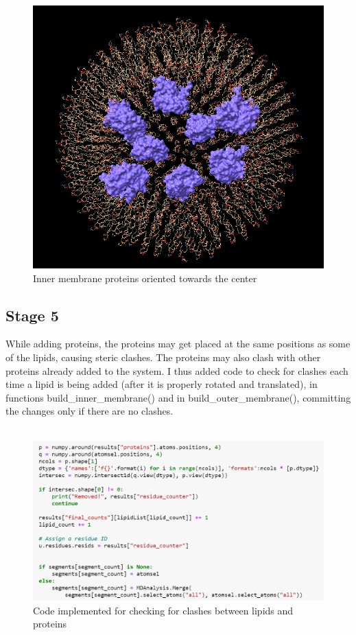 \documentclass[12pt, a4paper]{report}
\begin{document}
\begin{figure}[h]
    \includegraphics[scale=0.9]{images/inner membrane p.png} 
    \centering 
    \caption{Inner membrane proteins oriented towards the center}
    \centering
\end{figure} 

\clearpage
\subsection*{Stage 5} 

While adding proteins, the proteins may get placed at the same positions as some of the lipids, causing steric clashes. The proteins may also clash with other proteins already added to the system. I thus added code to check for clashes each time a lipid is being added (after it is properly rotated and translated), in functions build\_inner\_membrane() and in build\_outer\_membrane(), committing the changes only if there are no clashes. 
\\~\\
\begin{figure}[h]
    \includegraphics[scale=0.57]{images/checking for clashes.png} 
    \centering 
    \caption{Code implemented for checking for clashes between lipids and proteins}
    \centering
\end{figure} 
\end{document}
